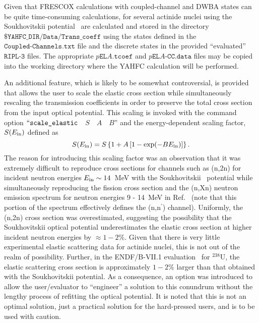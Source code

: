 \documentclass[
10pt,
showpacs,preprintnumbers,footinbib,
amsfonts,amsmath,amssymb,
aps,
prc,twocolumn,groupedaddress,superscriptaddress,
showkeys,
nofootinbib
]{revtex4-1}
\begin{document}
Given that FRESCOX calculations with coupled-channel and DWBA states can be quite time-consuming calculations, for several actinide nuclei using the Soukhovitskii potential~\cite{Soukhovitskii:2004} are calculated and stored in the directory ${\texttt{\$YAHFC\_DIR/Data/Trans\_coeff}}$ using the states defined in the ${\texttt{Coupled-Channels.txt}}$ file and the discrete states in the provided ``evaluated'' ${\texttt{RIPL-3}}$ files. The appropriate $p{\texttt{EL}}A{\texttt{.tcoef}}$ and $p{\texttt{EL}}A{\texttt{-CC.data}}$ files may be copied into the working directory where the YAHFC calculation will be performed.

An additional feature, which is likely to be somewhat controversial, is provided that allows the user to scale the elastic cross section while simultaneously rescaling the transmission coefficients in order to preserve the total cross section from the input optical potential. This scaling is invoked with the command option $``{\texttt{scale\_elastic}}$~~$S$~~$A$~~$B$'' and the energy-dependent scaling factor, $S(E_{\rm in})$ defined as
\begin{equation}
S(E_{\rm in}) = S\left \{ 1 + A\left [1-\exp(-BE_{\rm in})\right ] \right \}.
\end{equation}
The reason for introducing this scaling factor was an observation that it was extremely difficult to reproduce cross sections for channels such as (n,2n) for incident neutron energies $E_{\rm in} \sim 14$~MeV with the Soukhovitskii~\cite{Soukhovitskii:2004} potential while simultaneously reproducing the fission cross section and the (n,Xn) neutron emission spectrum for neutron energies 9 - 14~MeV in Ref.~\cite{Baba:1990} (note that this portion of the spectrum effectively defines the (n,n$^\prime$) channel). Uniformly, the (n,2n) cross section was overestimated, suggesting the possibility that the Soukhovitskii optical potential underestimates the elastic cross section at higher incident neutron energies by $\approx 1-2\%$. Given that there is very little experimental elastic scattering data for actinide nuclei, this is not out of the realm of possibility. Further, in the ENDF/B-VII.1 evaluation~\cite{ENDF/B-VII.1} for $^{238}$U, the elastic scattering cross section is approximately $1-2\%$ larger than that obtained with the Soukhovitskii potential. As a consequence, an option was introduced to allow the user/evaluator to ``engineer'' a solution to this conundrum without the lengthy process of refitting the optical potential. It is noted that this is not an optimal solution, just a practical solution for the hard-pressed users, and is to be used with caution. 
\end{document}
